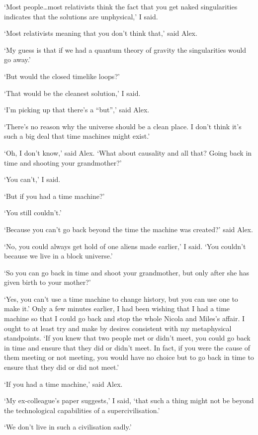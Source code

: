 `Most people\dots most {\twelveit relativists\/} think the fact that you get naked singularities indicates that the solutions are unphysical,' I said.

`Most relativists meaning that you don't think that,' said Alex.

`My guess is that if we had a quantum theory of gravity the
singularities would go away.'

`But would the closed timelike loops?'

`That would be the cleanest solution,' I said.

`I'm picking up that there's a ``but'',' said Alex.

`There's no reason why the universe should be a clean place. I don't think it's such a big deal that time machines might exist.'

`Oh, I don't know,' said Alex. `What about causality and all that? Going back in time and
shooting your grandmother?'

`You can't,' I said.

`But if you had a time machine?'

`You still couldn't.'

`Because you can't go back beyond the time the machine was created?' said Alex.

`No, you could always get hold of one aliens made earlier,' I said. `You couldn't because we
live in a block universe.'

`So you can go back in time and shoot your grandmother, but only after she has given birth to your mother?'

`Yes, you can't use a time machine to change history, but you can use one to make it.' Only a few minutes earlier, I had been wishing that I had a time machine so that I could go back and stop the whole Nicola and Miles's affair. I ought to at least try and make by desires consistent with my metaphysical standpoints. `If you knew that two people met or didn't meet, you could go back in time and ensure that they did or didn't meet. In fact, if you were the cause of them meeting or not meeting, you would have no choice but to go back in time to ensure that they did or did not meet.'

`If you had a time machine,' said Alex.

`My ex-colleague's paper suggests,' I said, `that such a thing might not be beyond the technological capabilities of a supercivilisation.'

`We don't live in such a civilisation sadly.'


